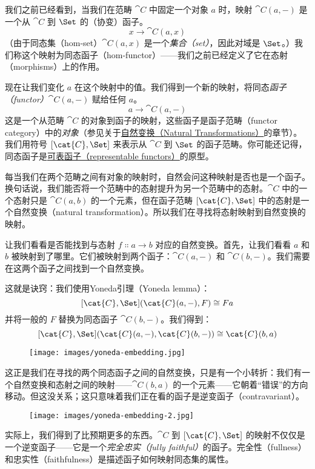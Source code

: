 
\lettrine[lhang=0.17]{我}{们之前已经看到}，当我们在范畴 $\cat{C}$ 中固定一个对象 $a$ 时，映射 $\cat{C}(a, -)$ 是一个从 $\cat{C}$ 到 $\Set$ 的（协变）函子。
\[x \to \cat{C}(a, x)\]
（由于同态集（hom-set）$\cat{C}(a, x)$ 是一个\emph{集合（set）}，因此对域是 $\Set$。）我们称这个映射为同态函子（hom-functor）——我们之前已经定义了它在态射（morphisms）上的作用。

现在让我们变化 $a$ 在这个映射中的值。我们得到一个新的映射，将同态\emph{函子（functor）}$\cat{C}(a, -)$ 赋给任何 $a$。
\[a \to \cat{C}(a, -)\]
这是一个从范畴 $\cat{C}$ 的对象到函子的映射，这些函子是函子范畴（functor category）中的\emph{对象}（参见关于\hyperref[natural-transformations]{自然变换（Natural Transformations）}的章节）。我们用符号 $[\cat{C}, \Set]$ 来表示从 $\cat{C}$ 到 $\Set$ 的函子范畴。你可能还记得，同态函子是\hyperref[representable-functors]{可表函子（representable functors）}的原型。

每当我们在两个范畴之间有对象的映射时，自然会问这种映射是否也是一个函子。换句话说，我们能否将一个范畴中的态射提升为另一个范畴中的态射。$\cat{C}$ 中的一个态射只是 $\cat{C}(a, b)$ 的一个元素，但在函子范畴 $[\cat{C}, \Set]$ 中的态射是一个自然变换（natural transformation）。所以我们在寻找将态射映射到自然变换的映射。

让我们看看是否能找到与态射 $f \Colon a \to b$ 对应的自然变换。首先，让我们看看 $a$ 和 $b$ 被映射到了哪里。它们被映射到两个函子：$\cat{C}(a, -)$ 和 $\cat{C}(b, -)$。我们需要在这两个函子之间找到一个自然变换。

这就是诀窍：我们使用Yoneda引理（Yoneda lemma）：
\[[\cat{C}, \Set](\cat{C}(a, -), F) \cong F a\]
并将一般的 $F$ 替换为同态函子 $\cat{C}(b, -)$。我们得到：
\[[\cat{C}, \Set](\cat{C}(a, -), \cat{C}(b, -)) \cong \cat{C}(b, a)\]
\begin{figure}[H]
  \centering
  \texttt{[image: images/yoneda-embedding.jpg]}
\end{figure}

\noindent
这正是我们在寻找的两个同态函子之间的自然变换，只是有一个小转折：我们有一个自然变换和态射之间的映射——$\cat{C}(b, a)$ 的一个元素——它朝着“错误”的方向移动。但这没关系；这只意味着我们正在看的函子是逆变函子（contravariant）。

\begin{figure}[H]
  \centering
  \texttt{[image: images/yoneda-embedding-2.jpg]}
\end{figure}

\noindent
实际上，我们得到了比预期更多的东西。$\cat{C}$ 到 $[\cat{C}, \Set]$ 的映射不仅仅是一个逆变函子——它是一个\emph{完全忠实（fully faithful）}的函子。完全性（fullness）和忠实性（faithfulness）是描述函子如何映射同态集的属性。


